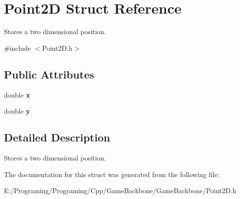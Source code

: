 \hypertarget{struct_point2_d}{}\section{Point2D Struct Reference}
\label{struct_point2_d}


Stores a two dimensional position.  




{\ttfamily \#include $<$Point2\+D.\+h$>$}

\subsection*{Public Attributes}
\begin{DoxyCompactItemize}
\item 
\mbox{\label{struct_point2_d_a42fcad8b63853b1136e6207ace6d555e}} 
double {\bfseries x}
\item 
\mbox{\label{struct_point2_d_a55747be726950fdcba27c1ad032bfdf1}} 
double {\bfseries y}
\end{DoxyCompactItemize}


\subsection{Detailed Description}
Stores a two dimensional position. 



The documentation for this struct was generated from the following file\+:\begin{DoxyCompactItemize}
\item 
E\+:/\+Programing/\+Programing/\+Cpp/\+Game\+Backbone/\+Game\+Backbone/Point2\+D.\+h\end{DoxyCompactItemize}
